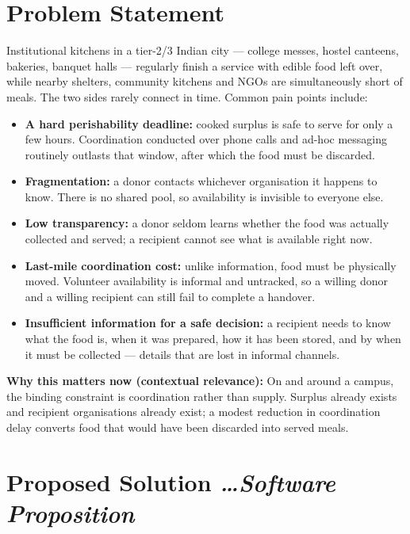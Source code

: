 \documentclass[11pt,a4paper]{article}
\newcommand{\BvrHint}[1]{%
  {\normalfont\normalsize\itshape\hfill #1}}
\begin{document}
\section{Problem Statement}
Institutional kitchens in a tier-2/3 Indian city --- college messes, hostel canteens, bakeries, banquet halls --- regularly finish a service with edible food left over, while nearby shelters, community kitchens and NGOs are simultaneously short of meals. The two sides rarely connect in time. Common pain points include:
\begin{itemize}[leftmargin=0.7cm]
    \item \textbf{A hard perishability deadline:} cooked surplus is safe to serve for only a few hours. Coordination conducted over phone calls and ad-hoc messaging routinely outlasts that window, after which the food must be discarded.
    \item \textbf{Fragmentation:} a donor contacts whichever organisation it happens to know. There is no shared pool, so availability is invisible to everyone else.
    \item \textbf{Low transparency:} a donor seldom learns whether the food was actually collected and served; a recipient cannot see what is available right now.
    \item \textbf{Last-mile coordination cost:} unlike information, food must be physically moved. Volunteer availability is informal and untracked, so a willing donor and a willing recipient can still fail to complete a handover.
    \item \textbf{Insufficient information for a safe decision:} a recipient needs to know what the food is, when it was prepared, how it has been stored, and by when it must be collected --- details that are lost in informal channels.
\end{itemize}

\textbf{Why this matters now (contextual relevance):} On and around a campus, the binding constraint is coordination rather than supply. Surplus already exists and recipient organisations already exist; a modest reduction in coordination delay converts food that would have been discarded into served meals.

\section{Proposed Solution %
\BvrHint{\ldots Software Proposition}}
\end{document}

